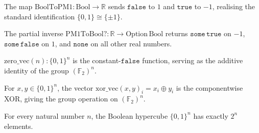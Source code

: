 \begin{definition}
\label{BoolFourier.BoolToPM1}
\leanok
{}
The map $\mathrm{BoolToPM1} : \mathrm{Bool} \to \mathbb{R}$ sends $\mathtt{false}$
to $1$ and $\mathtt{true}$ to $-1$, realising the standard identification
$\{0,1\} \cong \{\pm 1\}$.
\end{definition}

\begin{definition}
\label{BoolFourier.PM1ToBool?}
\leanok
The partial inverse $\mathrm{PM1ToBool?} : \mathbb{R} \to \mathrm{Option}\,\mathrm{Bool}$
returns $\mathtt{some}\,\mathtt{true}$ on $-1$, $\mathtt{some}\,\mathtt{false}$ on $1$,
and $\mathtt{none}$ on all other real numbers.
\end{definition}

\begin{definition}
\label{BoolFourier.zero_vec}
\leanok
{}
$\mathrm{zero\_vec}(n) : \{0,1\}^n$ is the constant-$\mathtt{false}$ function, serving
as the additive identity of the group $(\mathbb{F}_2)^n$.
\end{definition}

\begin{definition}
\label{BoolFourier.xor_vec}
\leanok
{}
For $x, y \in \{0,1\}^n$, the vector $\mathrm{xor\_vec}(x,y)_i = x_i \oplus y_i$ is
the componentwise XOR, giving the group operation on $(\mathbb{F}_2)^n$.
\end{definition}

\begin{lemma}
\label{BoolFourier.card_hypercube}
\leanok
{}
For every natural number $n$, the Boolean hypercube $\{0,1\}^n$ has exactly $2^n$
elements.
\end{lemma}

